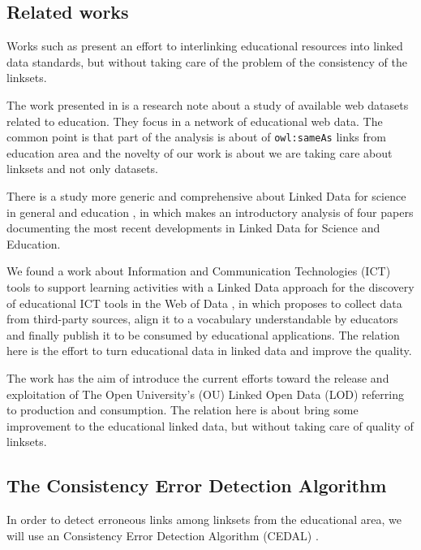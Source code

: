 \subsection{Related works}

Works such as \cite{rajabi2015interlinking,dietze2013interlinking,Dietze:2012:LEI:2245276.2245347} present an effort to interlinking educational resources into linked data standards, but without taking care of the problem of the consistency of the linksets.

The work presented in \cite{d2013assessing} is a research note about a study of available web datasets related to education. They focus in a network of educational web data. The common point is that part of the analysis is about of \texttt{owl:sameAs} links from education area and the novelty of our work is about we are taking care about linksets and not only datasets.
    
There is a study more generic and comprehensive about Linked Data for science in general and education \cite{kessler2013linked}, in which makes an introductory analysis of four papers documenting the most recent developments in Linked Data for Science and Education.

We found a work about Information and Communication Technologies (ICT) tools to support learning activities with a Linked Data approach for the discovery of educational ICT tools in the Web of Data \cite{ruiz2012linked}, in which proposes to collect data from third-party sources, align it to a vocabulary understandable by educators and finally publish it to be consumed by educational applications. The relation here is the effort to turn educational data in linked data and improve the quality.

The work \cite{zablith2011linked} has the aim of introduce the current efforts toward the release and exploitation of The Open University’s (OU) Linked Open Data (LOD) referring to production and consumption. The relation here is about bring some improvement to the educational linked data, but without taking care of quality of linksets.

\subsection{The Consistency Error Detection Algorithm}

In order to detect erroneous links among linksets from the educational area, we will use an Consistency Error Detection Algorithm (CEDAL) \cite{cedal2017}.

